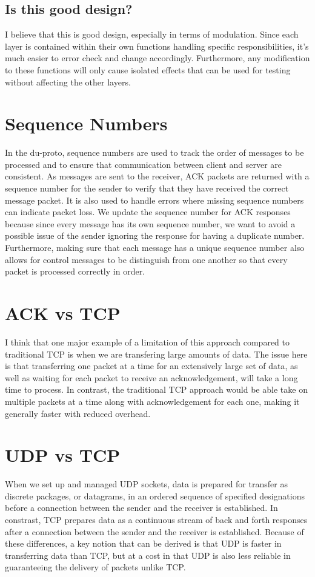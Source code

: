 \documentclass[12pt, a4paper]{article}
\begin{document}
{\subsection{Is this good design?}
I believe that this is good design, especially in terms of modulation. Since each layer is contained
within their own functions handling specific responsibilities, it's much easier to error check and
change accordingly. Furthermore, any modification to these functions will only cause isolated effects
that can be used for testing without affecting the other layers.

\section{Sequence Numbers}
In the du-proto, sequence numbers are used to track the order of messages to be processed and to ensure 
that communication between client and server are consistent. As messages are sent to the receiver, ACK
packets are returned with a sequence number for the sender to verify that they have received the correct
message packet. It is also used to handle errors where missing sequence numbers can indicate packet loss. 
\newline \newline
We update the sequence number for ACK responses because since every message has its own sequence number,
we want to avoid a possible issue of the sender ignoring the response for having a duplicate number. 
Furthermore, making sure that each message has a unique sequence number also allows for control messages
to be distinguish from one another so that every packet is processed correctly in order.

\section{ACK vs TCP}
I think that one major example of a limitation of this approach compared to traditional TCP is when
we are transfering large amounts of data. The issue here is that transferring one packet at a time
for an extensively large set of data, as well as waiting for each packet to receive an acknowledgement,
will take a long time to process. In contrast, the traditional TCP approach would be able take on
multiple packets at a time along with acknowledgement for each one, making it generally faster with
reduced overhead.

\section{UDP vs TCP}
When we set up and managed UDP sockets, data is prepared for transfer as discrete packages, or datagrams, 
in an ordered sequence of specified designations before a connection between the sender and the receiver 
is established. In constrast, TCP prepares data as a continuous stream of back and forth responses after
a connection between the sender and the receiver is established. Because of these differences, a key notion
that can be derived is that UDP is faster in transferring data than TCP, but at a cost in that UDP is also 
less reliable in guaranteeing the delivery of packets unlike TCP.

}
\end{document}
